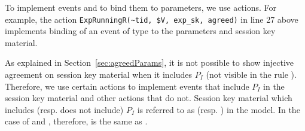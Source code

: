To implement events and
to bind them to parameters, we use actions.
%
For example, the action \verb|ExpRunningR(~tid, $V, exp_sk, agreed)| in line 27
above implements binding of an event of type \mRStart{} to the parameters and session key
material.%
%

As explained in Section~\ref{sec:agreedParams}, it is not possible to show
injective agreement on session key material when it includes
$P_I$ (not visible in the rule ).
%
Therefore, we use certain actions to implement events that include $P_I$ in the
session key material and other actions that do not.
%
Session key material which includes (resp. does not include) $P_I$ is referred
to as  (resp. ) in the
\mTamarin{} model.
%
In the case of \mSigSig{} and \mSigStat, therefore,  is the same as
.
%



